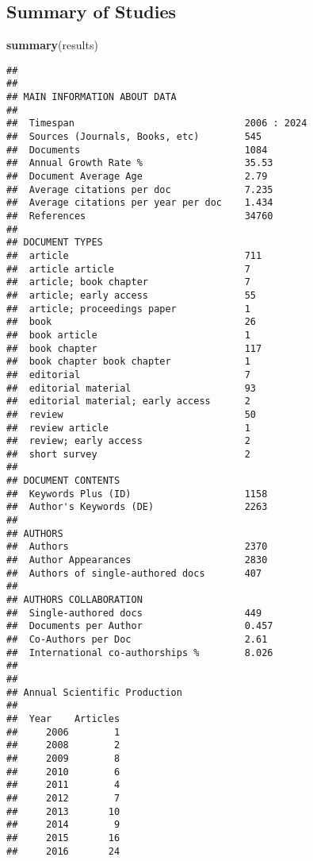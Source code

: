 \documentclass[
]{article}
\newenvironment{Shaded}{\begin{snugshade}}{\end{snugshade}}
\newcommand{\FunctionTok}[1]{\textcolor[rgb]{0.13,0.29,0.53}{\textbf{#1}}}
\newcommand{\NormalTok}[1]{#1}
\begin{document}
\subsection{Summary of Studies}\label{summary-of-studies}

\begin{Shaded}
\begin{Highlighting}[]
\FunctionTok{summary}\NormalTok{(results)}
\end{Highlighting}
\end{Shaded}

\begin{verbatim}
## 
## 
## MAIN INFORMATION ABOUT DATA
## 
##  Timespan                              2006 : 2024 
##  Sources (Journals, Books, etc)        545 
##  Documents                             1084 
##  Annual Growth Rate %                  35.53 
##  Document Average Age                  2.79 
##  Average citations per doc             7.235 
##  Average citations per year per doc    1.434 
##  References                            34760 
##  
## DOCUMENT TYPES                     
##  article                               711 
##  article article                       7 
##  article; book chapter                 7 
##  article; early access                 55 
##  article; proceedings paper            1 
##  book                                  26 
##  book article                          1 
##  book chapter                          117 
##  book chapter book chapter             1 
##  editorial                             7 
##  editorial material                    93 
##  editorial material; early access      2 
##  review                                50 
##  review article                        1 
##  review; early access                  2 
##  short survey                          2 
##  
## DOCUMENT CONTENTS
##  Keywords Plus (ID)                    1158 
##  Author's Keywords (DE)                2263 
##  
## AUTHORS
##  Authors                               2370 
##  Author Appearances                    2830 
##  Authors of single-authored docs       407 
##  
## AUTHORS COLLABORATION
##  Single-authored docs                  449 
##  Documents per Author                  0.457 
##  Co-Authors per Doc                    2.61 
##  International co-authorships %        8.026 
##  
## 
## Annual Scientific Production
## 
##  Year    Articles
##     2006        1
##     2008        2
##     2009        8
##     2010        6
##     2011        4
##     2012        7
##     2013       10
##     2014        9
##     2015       16
##     2016       24

\end{verbatim}
\end{document}
